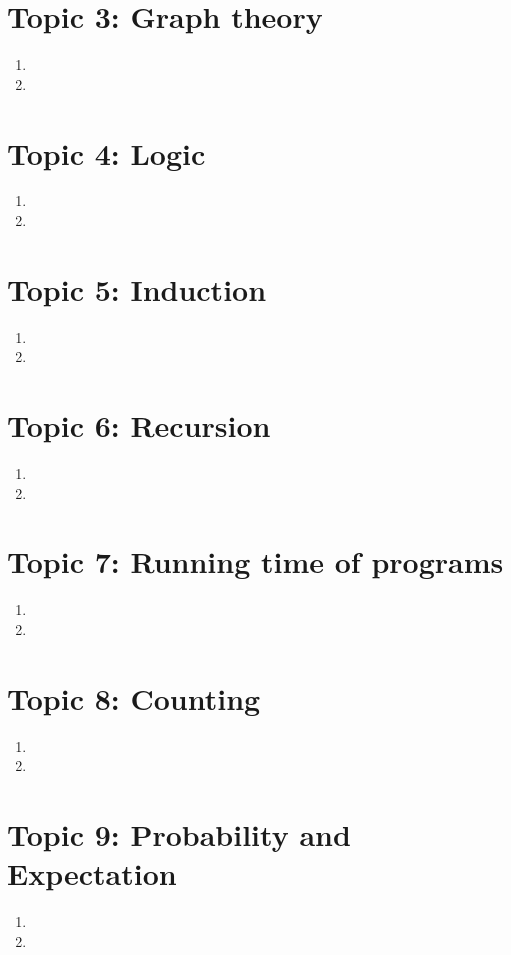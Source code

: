 \documentclass[11pt, a4paper]{article}
\begin{document}
\section*{Topic 3: Graph theory}
    \begin{enumerate}
        \item
        \item
    \end{enumerate}

\section*{Topic 4: Logic}
    \begin{enumerate}
        \item
        \item
    \end{enumerate}

\section*{Topic 5: Induction}
    \begin{enumerate}
        \item
        \item
    \end{enumerate}

\section*{Topic 6: Recursion}
    \begin{enumerate}
        \item
        \item
    \end{enumerate}

\section*{Topic 7: Running time of programs}
    \begin{enumerate}
        \item
        \item
    \end{enumerate}

\section*{Topic 8: Counting}
    \begin{enumerate}
        \item
        \item
    \end{enumerate}

\section*{Topic 9: Probability and Expectation}
    \begin{enumerate}
        \item
        \item
    \end{enumerate}
\end{document}
